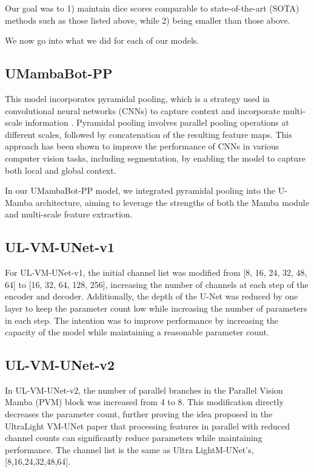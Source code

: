 \documentclass[conference]{IEEEtran}
\begin{document}
Our goal was to 1) maintain dice scores comparable to state-of-the-art (SOTA) methods such as those listed above, while 2) being smaller than those above.

We now go into what we did for each of our models.


\subsection{UMambaBot-PP}

This model incorporates pyramidal pooling, which is a strategy used in convolutional neural networks (CNNs) to capture context and incorporate multi-scale information \cite{zhao2017pyramid}. Pyramidal pooling involves parallel pooling operations at different scales, followed by concatenation of the resulting feature maps. This approach has been shown to improve the performance of CNNs in various computer vision tasks, including segmentation, by enabling the model to capture both local and global context.

In our UMambaBot-PP model, we integrated pyramidal pooling into the U-Mamba architecture, aiming to leverage the strengths of both the Mamba module and multi-scale feature extraction.


\subsection{UL-VM-UNet-v1}
For UL-VM-UNet-v1, the initial channel list was modified from [8, 16, 24, 32, 48, 64] to [16, 32, 64, 128, 256], increasing the number of channels at each step of the encoder and decoder. Additionally, the depth of the U-Net was reduced by one layer to keep the parameter count low while increasing the number of parameters in each step. The intention was to improve performance by increasing the capacity of the model while maintaining a reasonable parameter count.

\subsection{UL-VM-UNet-v2}
In UL-VM-UNet-v2, the number of parallel branches in the Parallel Vision Mamba (PVM) block was increased from 4 to 8. This modification directly decreases the parameter count, further proving the idea proposed in the UltraLight VM-UNet paper \cite{wu2024ultralight} that processing features in parallel with reduced channel counts can significantly reduce parameters while maintaining performance. The channel list is the same as Ultra LightM-UNet's, [8,16,24,32,48,64].
\end{document}

